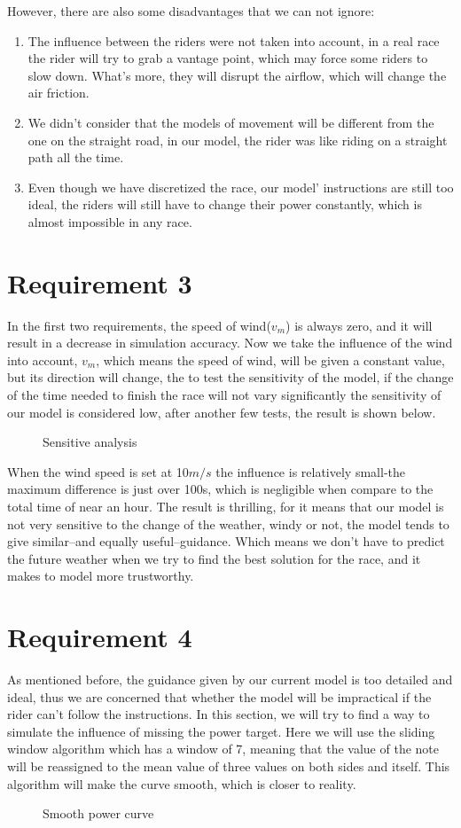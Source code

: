 \documentclass[12pt]{article}
\begin{document}
However, there are also some disadvantages that we can not ignore:
\begin{enumerate}
    \item The influence between the riders were not taken into account, in a real race the rider will try to grab a vantage point, which may force some riders to
          slow down. What's more, they will disrupt the airflow, which will change the air friction.%
    \item We didn't consider that the models of movement will be different from the one on the straight road, in our model, the rider was like riding on a straight path
          all the time.%
    \item Even though we have discretized the race, our model' instructions are still too ideal, the riders will still have to change their power constantly, which is
          almost impossible in any race. %
\end{enumerate}
\section{Requirement 3}
In the first two requirements, the speed of wind($v_m$) is always zero, and it will result in a decrease in simulation accuracy.
Now we take the influence of the wind into account,  $v_m$, which means the speed of wind, will be given a constant value, but its direction will change, the
to test the sensitivity of the model, if the change of the time needed to finish the race will not vary significantly the sensitivity of our model
is considered low, after another few tests, the result is shown below.
\begin{figure}
    \centering
    
    \caption{Sensitive analysis}
\end{figure}
When the wind speed is set at 10$m/s$ the influence is relatively small-the maximum difference is just over 100s, which is negligible when compare to the total time of
near an hour. The result is thrilling, for it means that our model is not very sensitive to the change of the weather, windy or not, the model tends to give similar--and
equally useful--guidance. Which means we don't have to predict the future weather when we try to find the best solution for the race, and it makes to model more trustworthy.
\section{Requirement 4}
As mentioned before, the guidance given by our current model is too detailed and ideal, thus we are concerned that whether the model will be impractical if the rider can't
follow the instructions. In this section, we will try to find a way to simulate the influence of missing the power target. Here we will use the sliding window algorithm which
has a window of 7, meaning that the value of the note will be reassigned to the mean value of three values on both sides and itself. This algorithm will make the curve smooth, which is closer to reality.
\begin{figure}
    \centering
    
    \caption{Smooth power curve}
\end{figure}
\end{document}
